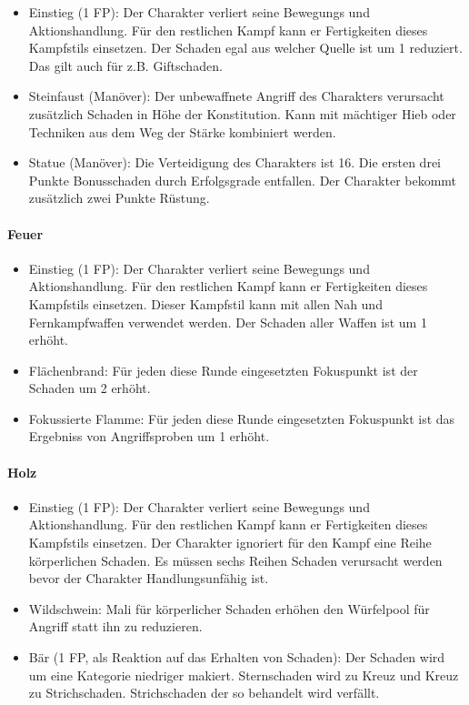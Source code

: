 \documentclass{article}
\begin{document}
\begin{itemize}
\item Einstieg (1 FP): Der Charakter verliert seine Bewegungs und Aktionshandlung. Für den restlichen Kampf kann er Fertigkeiten dieses Kampfstils einsetzen. Der Schaden egal aus welcher Quelle ist um 1 reduziert. Das gilt auch für z.B. Giftschaden.
\item Steinfaust (Manöver): Der unbewaffnete Angriff des Charakters verursacht zusätzlich Schaden in Höhe der Konstitution. Kann mit mächtiger Hieb oder Techniken aus dem Weg der Stärke kombiniert werden.
\item Statue (Manöver): Die Verteidigung des Charakters ist 16. Die ersten drei Punkte Bonusschaden durch Erfolgsgrade entfallen. Der Charakter bekommt zusätzlich zwei Punkte Rüstung.
\end{itemize}

\paragraph{Feuer}

\begin{itemize}
\item Einstieg (1 FP): Der Charakter verliert seine Bewegungs und Aktionshandlung. Für den restlichen Kampf kann er Fertigkeiten dieses Kampfstils einsetzen. Dieser Kampfstil kann mit allen Nah und Fernkampfwaffen verwendet werden. Der Schaden aller Waffen ist um 1 erhöht.
\item Flächenbrand: Für jeden diese Runde eingesetzten Fokuspunkt ist der Schaden um 2 erhöht.
\item Fokussierte Flamme: Für jeden diese Runde eingesetzten Fokuspunkt ist das Ergebniss von Angriffsproben um 1 erhöht.
\end{itemize}

\paragraph{Holz}

\begin{itemize}
\item Einstieg (1 FP): Der Charakter verliert seine Bewegungs und Aktionshandlung. Für den restlichen Kampf kann er Fertigkeiten dieses Kampfstils einsetzen. Der Charakter ignoriert für den Kampf eine Reihe körperlichen Schaden. Es müssen sechs Reihen Schaden verursacht werden bevor der Charakter Handlungsunfähig ist.
\item Wildschwein: Mali für körperlicher Schaden erhöhen den Würfelpool für Angriff statt ihn zu reduzieren.
\item Bär (1 FP, als Reaktion auf das Erhalten von Schaden): Der Schaden wird um eine Kategorie niedriger makiert. Sternschaden wird zu Kreuz und Kreuz zu Strichschaden. Strichschaden der so behandelt wird verfällt.
\end{itemize}
\end{document}
